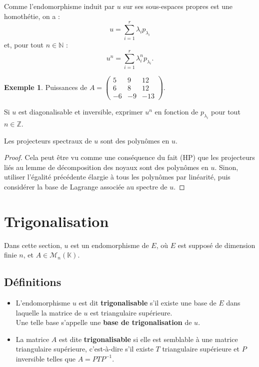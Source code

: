 \documentclass[french]{article}
\newcommand{\N}{\mathbb{N}}
\newcommand{\Z}{\mathbb{Z}}
\newcommand{\K}{\mathbb{K}}
\newcommand{\inv}{^{-1}}
\theoremstyle{plain}
\theoremstyle{definition}
\newtheorem*{ex}{Exemple}
\theoremstyle{remark}
\begin{document}
	Comme l'endomorphisme induit par $u$ sur ses sous-espaces propres est une homothétie, on a : $$u=\sum_{i=1}^{r}\lambda_ip_{\lambda_i}$$ et, pour tout $n\in\N$ : $$u^n=\sum_{i=1}^{r}\lambda_i^np_{\lambda_i}.$$
	
	\begin{ex}
		Puissances de $A=\begin{pmatrix}
			5&9&12\\
			6&8&12\\
			-6&-9&-13
		\end{pmatrix}$.
	\end{ex}
	
	\begin{exo}
		 Si $u$ est diagonalisable et inversible, exprimer $u^n$ en fonction de $p_{\lambda_i}$ pour tout $n\in\Z$.
	\end{exo}
	
	\begin{prop}%
		Les projecteurs spectraux de $u$ sont des polynômes en $u$.
	\end{prop}
	\begin{proof}
		Cela peut être vu comme une conséquence du fait (HP) que les projecteurs liés au lemme de décomposition des noyaux sont des polynômes en $u$. Sinon, utiliser l'égalité précédente élargie à tous les polynômes par linéarité, puis considérer la base de Lagrange associée au spectre de $u$.
	\end{proof}
	
	\section{Trigonalisation}
	
	Dans cette section, $u$ est un endomorphisme de $E$, où $E$ est supposé de dimension finie $n$, et $A\in\mathcal{M}_n(\K)$.
	
	\subsection{Définitions}
	
	\begin{dfn}
		\begin{itemize}
			\item L'endomorphisme $u$ est dit \textbf{trigonalisable} s'il existe une base de $E$ dans laquelle la matrice de $u$ est triangulaire supérieure.\\
			Une telle base s'appelle une \textbf{base de trigonalisation} de $u$.
			\item La matrice $A$ est dite \textbf{trigonalisable} si elle est semblable à une matrice triangulaire supérieure, c'est-à-dire s'il existe $T$ triangulaire supérieure et $P$ inversible telles que $A=PTP\inv$.
		\end{itemize}
	\end{dfn}
	
\end{document}
